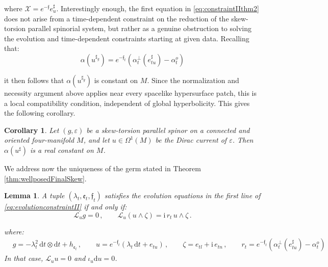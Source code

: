 \documentclass[10pt,reqno,a4paper]{amsart}
\theoremstyle{plain}
\newtheorem{lemma}[thm]{Lemma}
\newtheorem{cor}[thm]{Corollary}
\theoremstyle{definition}
\theoremstyle{remark}
\theoremstyle{remark}
\def\dd{\mathrm{d}}
\def\cL{\mathcal{L}}
\def\cX{\mathcal{X}}
\def\cL{\mathcal{L}}
\def\fre{\mathfrak{e}}
\renewcommand{\(}{ (}
\renewcommand{\)}{ )}
\newcommand{\frf}{\mathfrak{f}}
\begin{document}
\noindent
where $\cX = e^{-\frf} e^{\sharp}_u$. Interestingly enough, the first equation in \eqref{eq:constraintIIthm2} does not arise from a time-dependent constraint on the reduction of the skew-torsion parallel spinorial system, but rather as a genuine obstruction to solving the evolution and time-dependent constraints starting at given data. Recalling that:
\begin{equation}
\label{eq:skewscreenrotationinvariant}
 \alpha(u^{\sharp_g})  =e^{-\frf_t} (\alpha_t^\perp(e^{\sharp}_{tu})-\alpha_t^o )
\end{equation}

\noindent
it then follows that $\alpha(u^{\sharp_g})$ is constant on $M$. Since the normalization and necessity argument above applies near every spacelike hypersurface patch, this is a local compatibility condition, independent of global hyperbolicity. This gives the following corollary.

\begin{cor}
Let $(g,\varepsilon)$ be a skew-torsion parallel spinor on a connected and oriented four-manifold $M$, and let $u\in\Omega^1(M)$ be the Dirac current of $\varepsilon$. Then $\alpha(u^{\sharp})$ is a real constant on $M$.
\end{cor} 

\noindent
We address now the uniqueness of the germ stated in Theorem \ref{thm:wellposedFinalSkew}.   

\begin{lemma}
\label{lemma:killingreformulation}
A tuple $(\lambda_t,\fre_t,\frf_t)$ satisfies the evolution equations in the first line of \eqref{eq:evolutionconstraintII} if and only if:
\begin{equation}
\label{eq:killingreformulation}
\cL_{u} g = 0\, , \qquad \cL_{u}(u\wedge\zeta) = \mathrm{i}\, r_t\, u\wedge\zeta\, .
\end{equation}

\noindent
where:
\begin{eqnarray*}
& g = -\lambda_t^2\, \dd t\otimes\dd t + h_{\fre_t}\, , \qquad u = e^{-\frf_t}(\lambda_t\, \dd t + e_{tu})\, , \qquad \zeta = e_{tl} + \mathrm{i}\, e_{tn}\, ,\qquad   r_t = e^{-\frf_t} ( \alpha^{\perp}_t(e^{\sharp}_{tu}) - \alpha^o_t ) 
\end{eqnarray*}
In that case, $\cL_{u} u = 0$ and $\iota_u \dd u = 0$.
\end{lemma}
\end{document}
